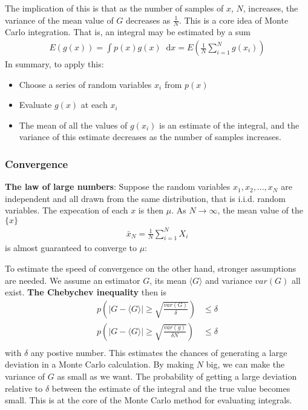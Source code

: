 \documentclass[twoside,english]{uiofysmaster}
\newcommand*\dif{\mathop{}\!\mathrm{d}}
\begin{document}
The implication of this is that as the number of samples of $x$, $N$, increases, the variance of the mean value of $G$ decreases as $\frac{1}{N}$. This is a core idea of Monte Carlo integration. That is, an integral may be estimated by a sum
\begin{align}
	E(g(x)) = \int p(x) g(x) \dif x = E(\frac{1}{N} \sum_{i=1}^N g(x_i))
\end{align}
In summary, to apply this:
\begin{itemize}
	\item Choose a series of random variables $x_i$ from $p(x)$
	\item Evaluate $g(x)$ at each $x_i$
	\item The mean of all the values of $g(x_i)$ is an estimate of the integral, and the variance of this estimate decreases as the number of samples increases.
\end{itemize}

\subsubsection{Convergence}
\textbf{The law of large numbers}: Suppose the random variables $x_1, x_2, ..., x_N$ are independent and all drawn from the same distribution, that is i.i.d. random variables. The expecation of each $x$ is then $\mu$. As $N\rightarrow \infty$, the mean value of the $\{ x \}$ 
\begin{align}
	\bar{x}_N = \frac{1}{N} \sum_{i=1}^N X_i
\end{align}
is almost guaranteed to converge to $\mu$:

To estimate the speed of convergence on the other hand, stronger assumptions are needed. We assume an estimator $G$, its mean $\langle G \rangle$ and variance $var(G)$ all exist. \textbf{The Chebychev inequality} then is
\begin{align}
	p(|G - \langle G \rangle | \geq \sqrt{\frac{var(G)}{\delta}}) &\leq \delta \\
	p(|G - \langle G \rangle | \geq \sqrt{\frac{var(g)}{\delta N}}) &\leq \delta \\
\end{align}
with $\delta$ any postive number. This estimates the chances of generating a large deviation in a Monte Carlo calculation. By making $N$ big, we can make the variance of $G$ as small as we want. The probability of getting a large deviation relative to $\delta$ between the estimate of the integral and the true value becomes small. This is at the core of the Monte Carlo method for evaluating integrals.
\end{document}
